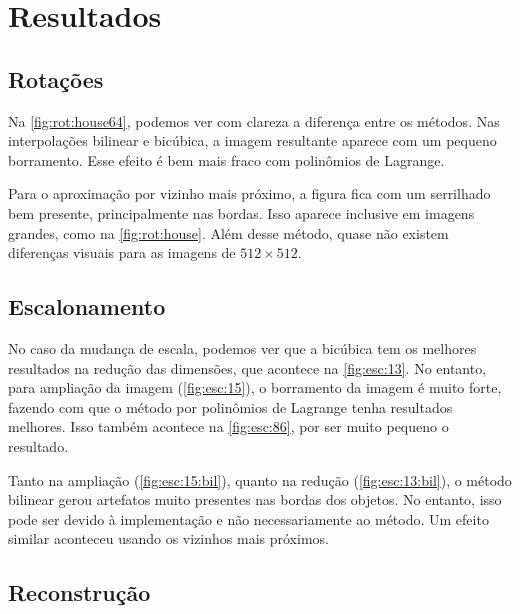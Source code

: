 \section{Resultados} \label{sec:resultados}

\subsection{Rotações}

    

    Na \cref{fig:rot:house64}, podemos ver com clareza a diferença entre os métodos. Nas interpolações bilinear e bicúbica, a imagem resultante aparece com um pequeno borramento. Esse efeito é bem mais fraco com polinômios de Lagrange.

    Para o aproximação por vizinho mais próximo, a figura fica com um serrilhado bem presente, principalmente nas bordas. Isso aparece inclusive em imagens grandes, como na \cref{fig:rot:house}. Além desse método, quase não existem diferenças visuais para as imagens de $512 \times 512$.

    

    

\subsection{Escalonamento} \label{sec:escalonamento}

    

    

    No caso da mudança de escala, podemos ver que a bicúbica tem os melhores resultados na redução das dimensões, que acontece na \cref{fig:esc:13}. No entanto, para ampliação da imagem (\cref{fig:esc:15}), o borramento da imagem é muito forte, fazendo com que o método por polinômios de Lagrange tenha resultados melhores. Isso também acontece na \cref{fig:esc:86}, por ser muito pequeno o resultado.

    Tanto na ampliação (\ref{fig:esc:15:bil}), quanto na redução (\ref{fig:esc:13:bil}), o método bilinear gerou artefatos muito presentes nas bordas dos objetos. No entanto, isso pode ser devido à implementação e não necessariamente ao método. Um efeito similar aconteceu usando os vizinhos mais próximos.

    

\subsection{Reconstrução}

